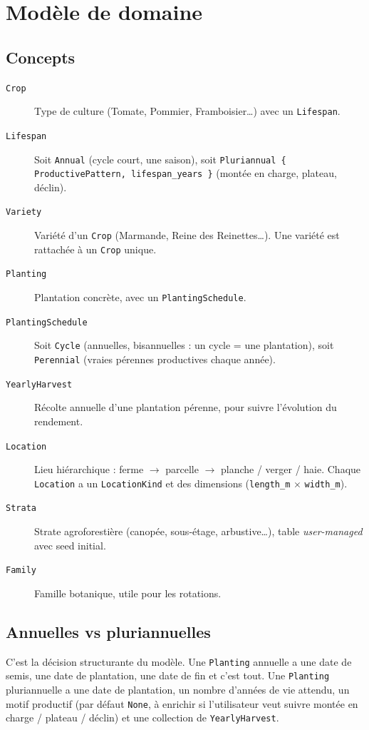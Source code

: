 \section{Modèle de domaine}

\subsection{Concepts}

\begin{description}
  \item[\texttt{Crop}] Type de culture (Tomate, Pommier, Framboisier\dots) avec un \texttt{Lifespan}.
  \item[\texttt{Lifespan}] Soit \texttt{Annual} (cycle court, une saison), soit \texttt{Pluriannual \{ ProductivePattern, lifespan\_years \}} (montée en charge, plateau, déclin).
  \item[\texttt{Variety}] Variété d'un \texttt{Crop} (Marmande, Reine des Reinettes\dots). Une variété est rattachée à un \texttt{Crop} unique.
  \item[\texttt{Planting}] Plantation concrète, avec un \texttt{PlantingSchedule}.
  \item[\texttt{PlantingSchedule}] Soit \texttt{Cycle} (annuelles, bisannuelles : un cycle = une plantation), soit \texttt{Perennial} (vraies pérennes productives chaque année).
  \item[\texttt{YearlyHarvest}] Récolte annuelle d'une plantation pérenne, pour suivre l'évolution du rendement.
  \item[\texttt{Location}] Lieu hiérarchique : ferme $\to$ parcelle $\to$ planche / verger / haie. Chaque \texttt{Location} a un \texttt{LocationKind} et des dimensions (\texttt{length\_m} $\times$ \texttt{width\_m}).
  \item[\texttt{Strata}] Strate agroforestière (canopée, sous-étage, arbustive\dots), table \emph{user-managed} avec seed initial.
  \item[\texttt{Family}] Famille botanique, utile pour les rotations.
\end{description}

\subsection{Annuelles vs pluriannuelles}

C'est la décision structurante du modèle. Une \texttt{Planting} annuelle a une date de semis, une date de plantation, une date de fin et c'est tout. Une \texttt{Planting} pluriannuelle a une date de plantation, un nombre d'années de vie attendu, un motif productif (par défaut \texttt{None}, à enrichir si l'utilisateur veut suivre montée en charge / plateau / déclin) et une collection de \texttt{YearlyHarvest}.

